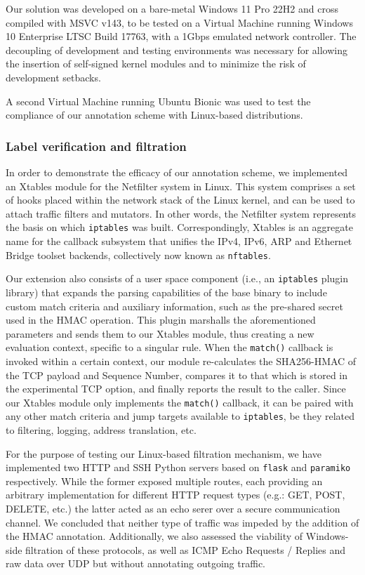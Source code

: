 Our solution was developed on a bare-metal Windows 11 Pro 22H2 and cross compiled with MSVC v143, to be tested on a Virtual Machine running Windows 10 Enterprise LTSC Build 17763, with a 1Gbps emulated network controller. The decoupling of development and testing environments was necessary for allowing the insertion of self-signed kernel modules and to minimize the risk of development setbacks.

A second Virtual Machine running Ubuntu Bionic was used to test the compliance of our annotation scheme with Linux-based distributions.

\subsubsection{Label verification and filtration}
\label{sign:windows:evaluation:linux}

In order to demonstrate the efficacy of our annotation scheme, we implemented an Xtables module for the Netfilter system in Linux. This system comprises a set of hooks placed within the network stack of the Linux kernel, and can be used to attach traffic filters and mutators. In other words, the Netfilter system represents the basis on which \texttt{iptables} was built. Correspondingly, Xtables is an aggregate name for the callback subsystem that unifies the IPv4, IPv6, ARP and Ethernet Bridge toolset backends, collectively now known as \texttt{nftables}.

Our extension also consists of a user space component (i.e., an \texttt{iptables} plugin library) that expands the parsing capabilities of the base binary to include custom match criteria and auxiliary information, such as the pre-shared secret used in the HMAC operation. This plugin marshalls the aforementioned parameters and sends them to our Xtables module, thus creating a new evaluation context, specific to a singular rule. When the \texttt{match()} callback is invoked within a certain context, our module re-calculates the SHA256-HMAC of the TCP payload and Sequence Number, compares it to that which is stored in the experimental TCP option, and finally reports the result to the caller. Since our Xtables module only implements the \texttt{match()} callback, it can be paired with any other match criteria and jump targets available to \texttt{iptables}, be they related to filtering, logging, address translation, etc.

For the purpose of testing our Linux-based filtration mechanism, we have implemented two HTTP and SSH Python servers based on \texttt{flask} and \texttt{paramiko} respectively. While the former exposed multiple routes, each providing an arbitrary implementation for different HTTP request types (e.g.: GET, POST, DELETE, etc.) the latter acted as an echo serer over a secure communication channel. We concluded that neither type of traffic was impeded by the addition of the HMAC annotation.  Additionally, we also assessed the viability of Windows-side filtration of these protocols, as well as ICMP Echo Requests / Replies and raw data over UDP but without annotating outgoing traffic.

